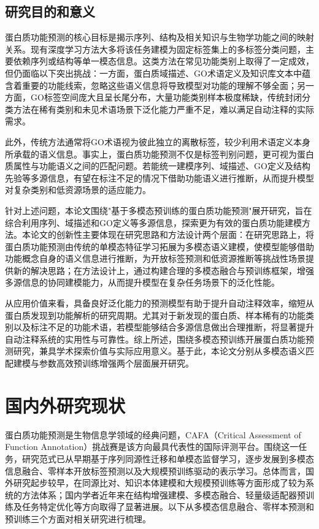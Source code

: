 \subsection{研究目的和意义}

蛋白质功能预测的核心目标是揭示序列、结构及相关知识与生物学功能之间的映射关系。现有深度学习方法大多将该任务建模为固定标签集上的多标签分类问题，主要依赖序列或结构等单一模态信息。这类方法在常见功能类别上取得了一定成效，但仍面临以下突出挑战：一方面，蛋白质域描述、GO术语定义及知识库文本中蕴含着重要的功能线索，忽略这些语义信息将导致模型对功能的理解不够全面；另一方面，GO标签空间庞大且呈长尾分布，大量功能类别样本极度稀缺，传统封闭分类方法在稀有类别和未见术语场景下泛化能力严重不足，难以满足自动注释的实际需求。

此外，传统方法通常将GO术语视为彼此独立的离散标签，较少利用术语定义本身所承载的语义信息。事实上，蛋白质功能预测不仅是标签判别问题，更可视为蛋白质属性与功能语义之间的匹配问题。若能统一建模序列、域描述、GO定义及结构先验等多源信息，有望在标注不足的情况下借助功能语义进行推断，从而提升模型对复杂类别和低资源场景的适应能力。

针对上述问题，本论文围绕"基于多模态预训练的蛋白质功能预测"展开研究，旨在综合利用序列、域描述和GO定义等多源信息，探索更为有效的蛋白质功能建模方法。本论文的创新性主要体现在研究思路和方法设计两个层面：在研究思路上，将蛋白质功能预测由传统的单模态特征学习拓展为多模态语义建模，使模型能够借助功能概念自身的语义信息进行推断，为开放标签预测和低资源推断等挑战性场景提供新的解决思路；在方法设计上，通过构建合理的多模态融合与预训练框架，增强多源信息的协同建模能力，从而提升模型在复杂任务场景下的泛化性能。

从应用价值来看，具备良好泛化能力的预测模型有助于提升自动注释效率，缩短从蛋白质发现到功能解析的研究周期。尤其对于新发现的蛋白质、样本稀有的功能类别以及标注不足的功能术语，若模型能够结合多源信息做出合理推断，将显著提升自动注释系统的实用性与可靠性。综上所述，围绕多模态预训练开展蛋白质功能预测研究，兼具学术探索价值与实际应用意义。基于此，本论文分别从多模态语义匹配建模与参数高效预训练增强两个层面展开研究。

\section{国内外研究现状}

蛋白质功能预测是生物信息学领域的经典问题，CAFA（Critical Assessment of Function Annotation）\cite{zhou2019cafa}挑战赛是该方向最具代表性的国际评测平台。围绕这一任务，研究范式已从早期基于序列同源性迁移和单模态监督学习，逐步发展到多模态信息融合、零样本开放标签预测以及大规模预训练驱动的表示学习\cite{song2023deep_cn}。总体而言，国外研究起步较早，在同源比对、知识本体建模和大规模预训练等方面形成了较为系统的方法体系；国内学者近年来在结构增强建模、多模态融合、轻量级适配器预训练及任务特定优化等方向取得了显著进展。以下从多模态信息融合、零样本预测和预训练三个方面对相关研究进行梳理。


